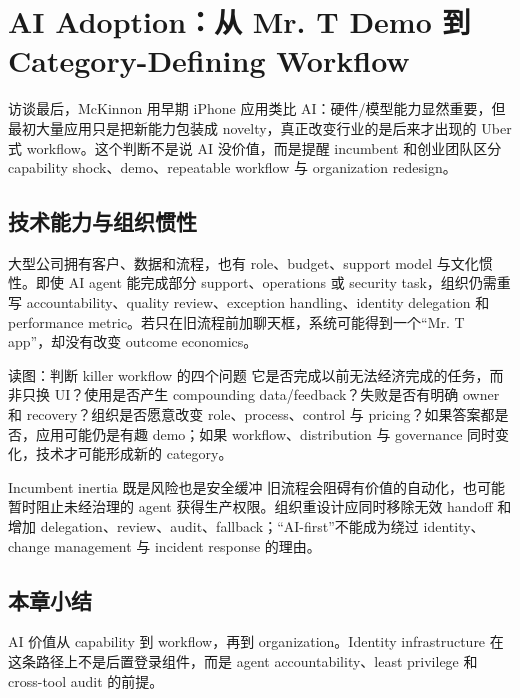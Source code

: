 \section{AI Adoption：从 Mr. T Demo 到 Category-Defining Workflow}

访谈最后，McKinnon 用早期 iPhone 应用类比 AI：硬件/模型能力显然重要，但最初大量应用只是把新能力包装成 novelty，真正改变行业的是后来才出现的 Uber 式 workflow。这个判断不是说 AI 没价值，而是提醒 incumbent 和创业团队区分 capability shock、demo、repeatable workflow 与 organization redesign。

\subsection{技术能力与组织惯性}

大型公司拥有客户、数据和流程，也有 role、budget、support model 与文化惯性。即使 AI agent 能完成部分 support、operations 或 security task，组织仍需重写 accountability、quality review、exception handling、identity delegation 和 performance metric。若只在旧流程前加聊天框，系统可能得到一个“Mr. T app”，却没有改变 outcome economics。


\begin{knowledgebox}{读图：判断 killer workflow 的四个问题}
它是否完成以前无法经济完成的任务，而非只换 UI？使用是否产生 compounding data/feedback？失败是否有明确 owner 和 recovery？组织是否愿意改变 role、process、control 与 pricing？如果答案都是否，应用可能仍是有趣 demo；如果 workflow、distribution 与 governance 同时变化，技术才可能形成新的 category。
\end{knowledgebox}


\begin{warningbox}{Incumbent inertia 既是风险也是安全缓冲}
旧流程会阻碍有价值的自动化，也可能暂时阻止未经治理的 agent 获得生产权限。组织重设计应同时移除无效 handoff 和增加 delegation、review、audit、fallback；“AI-first”不能成为绕过 identity、change management 与 incident response 的理由。
\end{warningbox}

\subsection{本章小结}

AI 价值从 capability 到 workflow，再到 organization。Identity infrastructure 在这条路径上不是后置登录组件，而是 agent accountability、least privilege 和 cross-tool audit 的前提。

